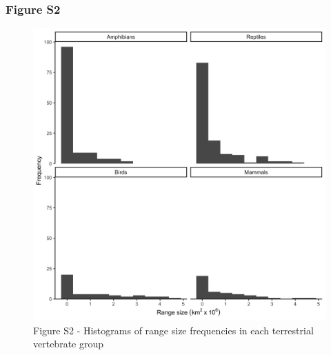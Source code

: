 \documentclass[12pt,openright,oneside,a4paper,english]{abntex2}
\begin{document}
\subsubsection*{Figure S2}\label{fig:fig1-s2}
\begin{figure}[H]
	\centering
	\includegraphics[width=160mm]{Fig c1-s2}
	\caption*{\small Figure S2 - Histograms of range size frequencies in each terrestrial vertebrate group}
\end{figure}

\pagebreak
\end{document}
